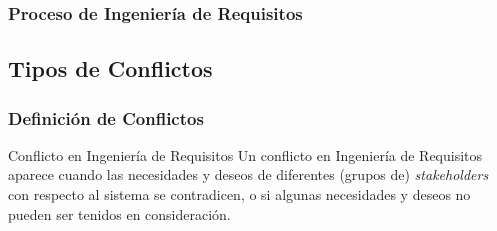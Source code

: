 \documentclass[a4paper,slidestop,xcolor=pst,dvips,blue]{beamer}
\begin{document}
\begin{frame}
    \frametitle{Proceso de Ingeniería de Requisitos}
\end{frame}

\subsection{Tipos de Conflictos}

\begin{frame}[c]
    \frametitle{Definición de Conflictos}
    \begin{block}{Conflicto en Ingeniería de Requisitos}
        Un conflicto en Ingeniería de Requisitos aparece cuando las necesidades y deseos de diferentes (grupos de) \emph{stakeholders} con respecto al sistema se contradicen, o si algunas necesidades y deseos no pueden ser tenidos en consideración.
    \end{block}
\end{frame}
\end{document}
